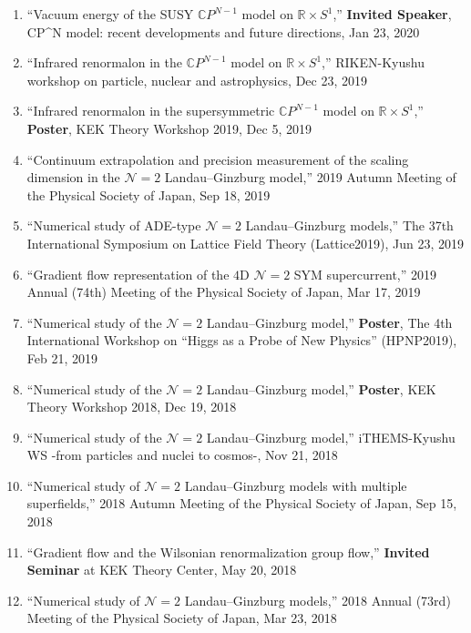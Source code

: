 \begin{enumerate}
       \textit{talk by H. Takaura},
       2020 Annual (75th) Meeting of the Physical Society of Japan, Mar 16, 2020
 \item ``Vacuum energy of the SUSY $\mathbb{C}P^{N-1}$ model on $\mathbb{R}\times S^1$,''
       \textbf{Invited Speaker}, CP\textasciicircum N model: recent developments and future directions, Jan 23, 2020
 \item ``Infrared renormalon in the $\mathbb{C}P^{N-1}$ model on $\mathbb{R}\times S^1$,''
       RIKEN-Kyushu workshop on particle, nuclear and astrophysics, Dec 23, 2019 
 \item ``Infrared renormalon in the supersymmetric $\mathbb{C}P^{N-1}$ model on $\mathbb{R}\times S^1$,''
       \textbf{Poster}, KEK Theory Workshop 2019, Dec 5, 2019 
 \item ``Continuum extrapolation and precision measurement of the scaling dimension in the $\mathcal{N}=2$ Landau--Ginzburg model,''
       2019 Autumn Meeting of the Physical Society of Japan, Sep 18, 2019
 \item ``Numerical study of ADE-type $\mathcal{N}=2$ Landau--Ginzburg models,''
       The 37th International Symposium on Lattice Field Theory (Lattice2019), Jun 23, 2019
 \item ``Gradient flow representation of the $4$D $\mathcal{N}=2$ SYM supercurrent,''
       2019 Annual (74th) Meeting of the Physical Society of Japan, Mar 17, 2019
 \item ``Numerical study of the $\mathcal{N}=2$ Landau--Ginzburg model,''
       \textbf{Poster}, The 4th International Workshop on ``Higgs as a Probe of New Physics'' (HPNP2019), Feb 21, 2019
 \item ``Numerical study of the $\mathcal{N}=2$ Landau--Ginzburg model,''
       \textbf{Poster}, KEK Theory Workshop 2018, Dec 19, 2018
 \item ``Numerical study of the $\mathcal{N}=2$ Landau--Ginzburg model,''
       iTHEMS-Kyushu WS -from particles and nuclei to cosmos-, Nov 21, 2018
 \item ``Numerical study of $\mathcal{N}=2$ Landau--Ginzburg models with multiple superfields,''
       2018 Autumn Meeting of the Physical Society of Japan, Sep 15, 2018
 \item ``Gradient flow and the Wilsonian renormalization group flow,''
       \textbf{Invited Seminar} at KEK Theory Center, May 20, 2018
 \item ``Numerical study of $\mathcal{N}=2$ Landau--Ginzburg models,''
       2018 Annual (73rd) Meeting of the Physical Society of Japan, Mar 23, 2018

\end{enumerate}
